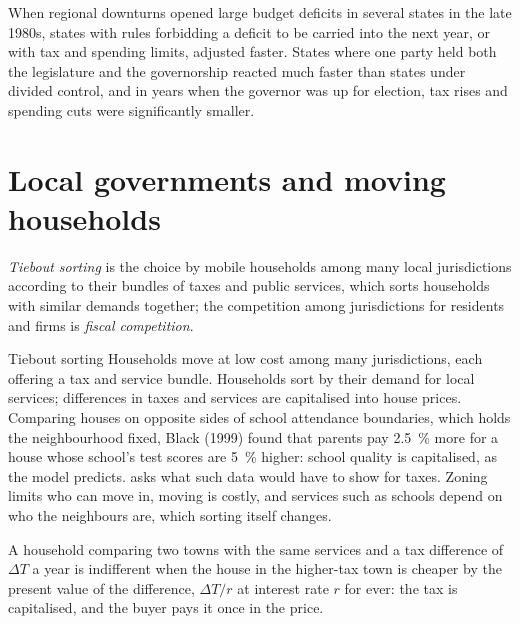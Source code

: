 \begin{record}
When regional downturns opened large budget deficits in several states in the late
1980s, states with rules forbidding a deficit to be carried into the next year,
or with tax and spending limits, adjusted faster. States where one party held both
the legislature and the governorship reacted much faster than states under
divided control, and in years when the governor was up for election, tax rises
and spending cuts were significantly smaller. %
\end{record}

\section{Local governments and moving households}\label{sec:b3:public-choice-voting:tiebout}

\begin{definition}\label{def:b3:public-choice-voting:tiebout}
\emph{Tiebout sorting} is the choice by mobile households among many local
jurisdictions according to their bundles of taxes and public services, which sorts
households with similar demands together; the competition among jurisdictions for
residents and firms is \emph{fiscal competition}.
\end{definition}

\begin{model}{Tiebout sorting}
\assumes Households move at low cost among many jurisdictions, each offering a
tax and service bundle.
\predicts Households sort by their demand for local services; differences in
taxes and services are capitalised into house prices.
\tested Comparing houses on opposite sides of school attendance boundaries, which
holds the neighbourhood fixed, Black (1999) found that parents pay 2.5~\% more for a
house whose school's test scores are 5~\% higher: school quality is capitalised, as
the model predicts. %
 asks what such data would have to show for taxes.
\breaks Zoning limits who can move in, moving is costly, and services such as
schools depend on who the neighbours are, which sorting itself changes.
\end{model}

A household comparing two towns with the same services and a tax difference of $\Delta T$
a year is indifferent when the house in the higher-tax town is cheaper by the
present value of the difference, $\Delta T/r$ at interest rate $r$ for ever: the tax is
capitalised, and the buyer pays it once in the price.

